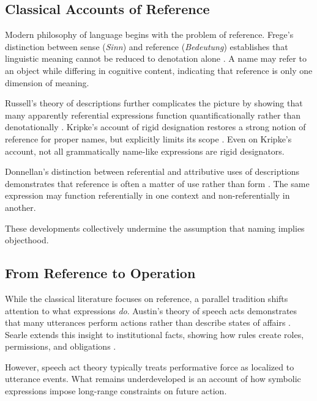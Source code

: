 \documentclass[11pt]{article}
\begin{document}
\subsection{Classical Accounts of Reference}

Modern philosophy of language begins with the problem of reference. Frege’s
distinction between sense (\emph{Sinn}) and reference (\emph{Bedeutung}) establishes
that linguistic meaning cannot be reduced to denotation alone
\cite{frege1892}. A name may refer to an object while differing in cognitive
content, indicating that reference is only one dimension of meaning.

Russell’s theory of descriptions further complicates the picture by showing that
many apparently referential expressions function quantificationally rather than
denotationally \cite{russell1905}. Kripke’s account of rigid designation restores
a strong notion of reference for proper names, but explicitly limits its scope
\cite{kripke1980}. Even on Kripke’s account, not all grammatically name-like
expressions are rigid designators.

Donnellan’s distinction between referential and attributive uses of descriptions
demonstrates that reference is often a matter of use rather than form
\cite{donnellan1966}. The same expression may function referentially in one
context and non-referentially in another.

These developments collectively undermine the assumption that naming implies
objecthood.

\subsection{From Reference to Operation}

While the classical literature focuses on reference, a parallel tradition shifts
attention to what expressions \emph{do}. Austin’s theory of speech acts
demonstrates that many utterances perform actions rather than describe states of
affairs \cite{austin1962}. Searle extends this insight to institutional facts,
showing how rules create roles, permissions, and obligations
\cite{searle1969}.

However, speech act theory typically treats performative force as localized to
utterance events. What remains underdeveloped is an account of how symbolic
expressions impose long-range constraints on future action.
\end{document}
